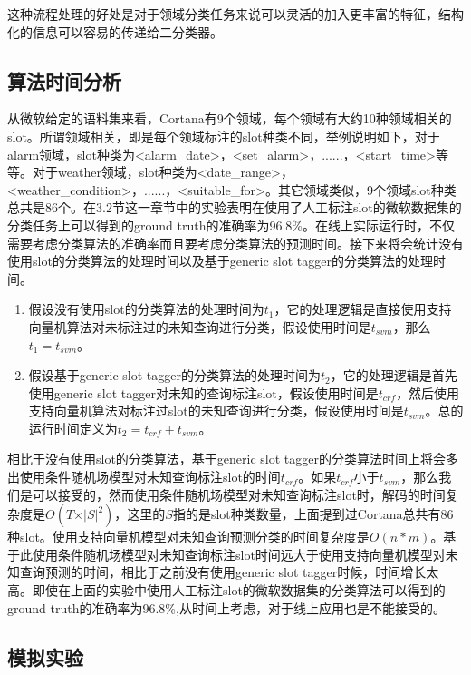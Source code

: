 \documentclass[master]{njuthesis}
\begin{document}
    这种流程处理的好处是对于领域分类任务来说可以灵活的加入更丰富的特征，结构化的信息可以容易的传递给二分类器。

\subsection{算法时间分析}

    从微软给定的语料集来看，Cortana有9个领域，每个领域有大约10种领域相关的slot。所谓领域相关，即是每个领域标注的slot种类不同，举例说明如下，对于alarm领域，slot种类为<alarm\_date>，<set\_alarm>，......，<start\_time>等等。对于weather领域，slot种类为<date\_range>，<weather\_condition>，......，<suitable\_for>。其它领域类似，9个领域slot种类总共是86个。在3.2节这一章节中的实验表明在使用了人工标注slot的微软数据集的分类任务上可以得到的ground truth的准确率为96.8\%。在线上实际运行时，不仅需要考虑分类算法的准确率而且要考虑分类算法的预测时间。接下来将会统计没有使用slot的分类算法的处理时间以及基于generic slot tagger的分类算法的处理时间。

\begin{enumerate}
 \item 假设没有使用slot的分类算法的处理时间为$t_1$，它的处理逻辑是直接使用支持向量机算法对未标注过的未知查询进行分类，假设使用时间是$t_{svm}$，那么$t_1 = t_{svm}$。
 \item 假设基于generic slot tagger的分类算法的处理时间为$t_2$，它的处理逻辑是首先使用generic slot tagger对未知的查询标注slot，假设使用时间是$t_{crf}$，然后使用支持向量机算法对标注过slot的未知查询进行分类，假设使用时间是$t_{svm}$。总的运行时间定义为$t_2 = t_{crf} + t_{svm}$。
\end{enumerate}

    相比于没有使用slot的分类算法，基于generic slot tagger的分类算法时间上将会多出使用条件随机场模型对未知查询标注slot的时间$t_{crf}$。如果$t_{crf}$小于$t_{svm}$，那么我们是可以接受的，然而使用条件随机场模型对未知查询标注slot时，解码的时间复杂度是$O\left(T\times\vert S \vert^2\right)$，这里的$S$指的是slot种类数量，上面提到过Cortana总共有86种slot。使用支持向量机模型对未知查询预测分类的时间复杂度是$O\left(n*m\right)$。基于此使用条件随机场模型对未知查询标注slot时间远大于使用支持向量机模型对未知查询预测的时间，相比于之前没有使用generic slot tagger时候，时间增长太高。即使在上面的实验中使用人工标注slot的微软数据集的分类算法可以得到的ground truth的准确率为96.8\%,从时间上考虑，对于线上应用也是不能接受的。

\subsection{模拟实验}
\end{document}
